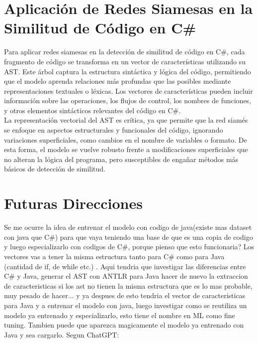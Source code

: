 \section{Aplicación de Redes Siamesas en la Similitud de Código en C\#}

Para aplicar redes siamesas en la detección de similitud de código en C\#, cada fragmento de código se transforma en un vector de características utilizando su AST. Este árbol captura la estructura sintáctica y lógica del código, permitiendo que el modelo aprenda relaciones más profundas que las posibles mediante representaciones textuales o léxicas. Los vectores de características pueden incluir información sobre las operaciones, los flujos de control, los nombres de funciones, y otros elementos sintácticos relevantes del código en C\#. \\

La representación vectorial del AST es crítica, ya que permite que la red siamés se enfoque en aspectos estructurales y funcionales del código, ignorando variaciones superficiales, como cambios en el nombre de variables o formato. De esta forma, el modelo se vuelve robusto frente a modificaciones superficiales que no alteran la lógica del programa, pero susceptibles de engañar métodos más básicos de detección de similitud.

\section{Futuras Direcciones}

 Se me ocurre la idea de entrenar el modelo con codigo de java(existe mas dataset con java que C\#) para que vaya teniendo una base de que es una copia de codigo y luego especializarlo con codigos de C\#, porque pienso que esto funcionaria? Los vectores vas a tener la misma estructura tanto para C# como para Java (cantidad de if, de while etc.) . Aqui tendria que investigar las diferencias entre C\# y Java, generar el AST con ANTLR para Java hacer de nuevo la extraccion de caracteristicas si los ast no tienen la misma estructura que es lo mas probable, muy pesado de hacer... y ya despues de esto tendria el vector de caracteristicas para Java y a entrenar el modelo con java, luego investigar como se reutiliza un modelo ya entrenado y especializarlo, esto tiene el nombre en ML como fine tuning. Tambien puede que aparezca magicamente el modelo ya entrenado con Java y sea cargarlo.  Segun ChatGPT:
 
